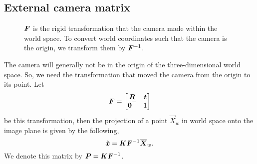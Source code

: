 \subsection{External camera matrix}

\begin{figure}[ht]
    \centering
    \caption{$\bm{F}$ is the rigid transformation that the camera made within
    the world space. To convert world coordinates such that the camera is the
    origin, we transform them by $\bm{F}^{-1}$.}
    \label{fig:pinhole-in-space}
\end{figure}

The camera will generally not be in the origin of the three-dimensional world
space. So, we need the transformation that moved the camera from the origin
to its point. Let \[
  \bm{F}=\begin{bmatrix} \bm{R} & \bm{t} \\ \bm{0}^\top & 1 \end{bmatrix}
\]
be this transformation, then the projection of a point $\vec{X}_w$ in
world space onto the image plane is given by the following, \[
  \tilde{\bm{x}} = \bm{K}\bm{F}^{-1}\overline{\bm{X}}_w
.\]
We denote this matrix by $\bm{P} = \bm{K}\bm{F}^{-1}$.
